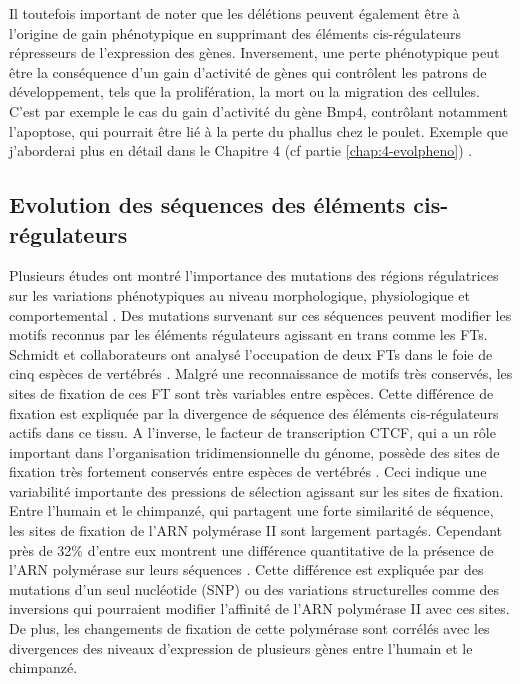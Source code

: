Il toutefois important de noter que les délétions peuvent également être à l’origine de gain phénotypique en supprimant des éléments \gls{cis}-régulateurs répresseurs de l’expression des gènes. Inversement, une perte phénotypique peut être la conséquence d’un gain d’activité de gènes qui contrôlent les patrons de développement, tels que la prolifération, la mort ou la migration des cellules. C’est par exemple le cas du gain d’activité du gène Bmp4, contrôlant notamment l’apoptose, qui pourrait être lié à la perte du phallus chez le poulet. Exemple que j’aborderai plus en détail dans le Chapitre 4 (cf partie \ref{chap:4-evolpheno}) \citep{herrera_developmental_2013}.

\subsection{Evolution des séquences des éléments \gls{cis}-régulateurs}
\label{subsec:evol-seq-regul}

Plusieurs études ont montré l’importance des mutations des régions régulatrices sur les variations phénotypiques au niveau morphologique, physiologique et comportemental \citep{wray_evolutionary_2007}. Des mutations survenant sur ces séquences peuvent modifier les motifs reconnus par les éléments régulateurs agissant en trans comme les \acrshort{FT}s. Schmidt et collaborateurs ont analysé l’occupation de deux \acrshort{FT}s dans le foie de cinq espèces de vertébrés \citep{schmidt_five-vertebrate_2010}. Malgré une reconnaissance de motifs très conservés, les sites de fixation de ces \acrshort{FT} sont très variables entre espèces. Cette différence de fixation est expliquée par la divergence de séquence des éléments \gls{cis}-régulateurs actifs dans ce tissu. A l’inverse, le facteur de transcription CTCF, qui a un rôle important dans l’organisation tridimensionnelle du génome, possède des sites de fixation très fortement conservés entre espèces de vertébrés \citep{schmidt_waves_2012}. Ceci indique une variabilité importante des pressions de sélection agissant sur les sites de fixation. Entre l’humain et le chimpanzé, qui partagent une forte similarité de séquence, les sites de fixation de l’ARN polymérase II sont largement partagés. Cependant près de 32\% d’entre eux montrent une différence quantitative de la présence de l’ARN polymérase sur leurs séquences \citep{kasowski_variation_2010}. Cette différence est expliquée par des mutations d’un seul nucléotide (SNP) ou des variations structurelles comme des inversions qui pourraient modifier l’affinité de l’ARN polymérase II avec ces sites. De plus, les changements de fixation de cette polymérase sont corrélés avec les divergences des niveaux d’expression de plusieurs gènes entre l’humain et le chimpanzé.

